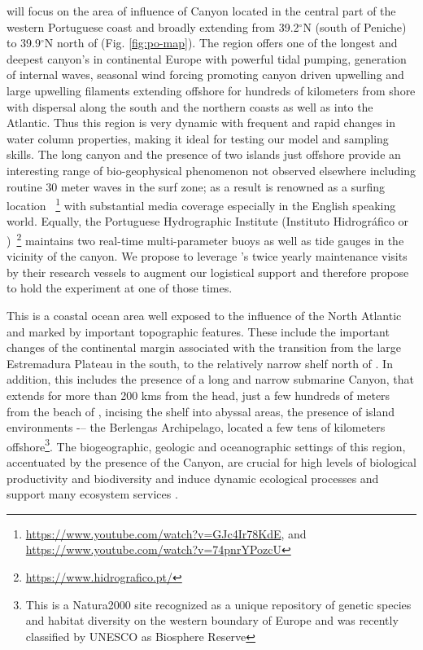 \proj will focus on the area of influence of \naz Canyon located in
the central part of the western Portuguese coast and broadly extending
from 39.2$^{\circ}$N (south of Peniche) to 39.9$^{\circ}$N north of
\naz (Fig. \ref{fig:po-map}). The region offers one of the longest and
deepest canyon's in continental Europe with powerful tidal pumping,
generation of internal waves, seasonal wind forcing promoting canyon
driven upwelling and large upwelling filaments extending offshore for
hundreds of kilometers from shore with dispersal along the south and
the northern coasts as well as into the Atlantic.  Thus this region is
very dynamic with frequent and rapid changes in water column
properties, making it ideal for testing our model and sampling skills.
The long canyon and the presence of two islands just offshore provide
an interesting range of bio-geophysical phenomenon not observed
elsewhere including routine 30 meter waves in the surf zone; as a
result \naz is renowned as a surfing location
~\footnote{\url{https://www.youtube.com/watch?v=GJc4Ir78KdE}, and
  \url{https://www.youtube.com/watch?v=74pnrYPozcU}} with substantial
media coverage especially in the English speaking world.  Equally, the
Portuguese Hydrographic Institute (Instituto Hidrogr\'{a}fico or
\inste)~\footnote{\url{https://www.hidrografico.pt/}} maintains two
real-time multi-parameter buoys as well as tide gauges in the vicinity
of the canyon. We propose to leverage \inste's twice yearly
maintenance visits by their research vessels to augment our logistical
support and therefore propose to hold the experiment at one of those
times.

This is a coastal ocean area well exposed to the influence of the
North Atlantic and marked by important topographic features. These
include the important changes of the continental margin associated
with the transition from the large Estremadura Plateau in the south,
to the relatively narrow shelf north of \naze. In addition, this
includes the presence of a long and narrow submarine \naz Canyon, that
extends for more than 200 kms from the head, just a few hundreds of
meters from the beach of \naze, incising the shelf into abyssal areas,
the presence of island environments -– the Berlengas Archipelago,
located a few tens of kilometers offshore\footnote{This is a
  Natura2000 site recognized as a unique repository of genetic species
  and habitat diversity on the western boundary of Europe and was
  recently classified by UNESCO as Biosphere Reserve}. The
biogeographic, geologic and oceanographic settings of this region,
accentuated by the presence of the \naz Canyon, are crucial for high
levels of biological productivity and biodiversity and induce dynamic
ecological processes and support many ecosystem services
\cite{tyler09,cunha11}.  

